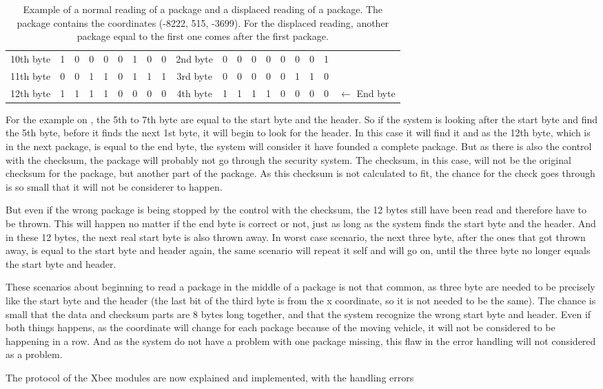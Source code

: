\begin{table}[H]
\begin{tabular}{c | m{0.1cm} m{0.1cm} m{0.1cm} m{0.1cm} m{0.1cm} m{0.1cm} m{0.1cm} m{0.1cm} | c | m{0.1cm} m{0.1cm} m{0.1cm} m{0.1cm} m{0.1cm} m{0.1cm} m{0.1cm} m{0.1cm} | l }
\cline{2-9} \cline{11-18}
10th byte & 1 & 0 & 0 & 0 & 0 & 1 & 0 & 0 & 2nd byte & 0 & 0 & 0 & 0 & 0 & 0 & 0 & 1 & \\
\cline{2-9} \cline{11-18}
11th byte & 0 & 0 & 1 & 1 & 0 & 1 & 1 & 1 & 3rd byte & 0 & 0 & 0 & 0 & 0 & 1 & 1 & 0 & \\
\cline{2-9} \cline{11-18}
12th byte & 1 & 1 & 1 & 1 & 0 & 0 & 0 & 0 & 4th byte & 1 & 1 & 1 & 1 & 0 & 0 & 0 & 0 & $\leftarrow$ End byte\\
\cline{2-9} \cline{11-18}
\end{tabular}
\caption{Example of a normal reading of a package and a displaced reading of a package. The package contains the coordinates (-8222, 515, -3699). For the displaced reading, another package equal to the first one comes after the first package.}
\label{errorPro}
\end{table}

For the example on , the 5th to 7th byte are equal to the start byte and the header. So if the system is looking after the start byte and find the 5th byte, before it finds the next 1st byte, it will begin to look for the header. In this case it will find it and as the 12th byte, which is in the next package, is equal to the end byte, the system will consider it have founded a complete package. But as there is also the control with the checksum, the package will probably not go through the security system. The checksum, in this case, will not be the original checksum for the package, but another part of the package. As this checksum is not calculated to fit, the chance for the check goes through is so small that it will not be considerer to happen. 

But even if the wrong package is being stopped by the control with the checksum, the 12 bytes still have been read and therefore have to be thrown. This will happen no matter if the end byte is correct or not, just as long as the system finds the start byte and the header. And in these 12 bytes, the next real start byte is also thrown away. In worst case scenario, the next three byte, after the ones that got thrown away, is equal to the start byte and header again, the same scenario will repeat it self and will go on, until the three byte no longer equals the start byte and header.

These scenarios about beginning to read a package in the middle of a package is not that common, as three byte are needed to be precisely like the start byte and the header (the last bit of the third byte is from the x coordinate, so it is not needed to be the same). The chance is small that the data and checksum parts are 8 bytes long together,  and that the system recognize the wrong start byte and header. Even if both things happens, as the coordinate will change for each package because of the moving vehicle, it will not be considered to be happening in a row. And as the system do not have a problem with one package missing, this flaw in the error handling will not considered as a problem.



The protocol of the Xbee modules are now explained and implemented, with the handling errors


